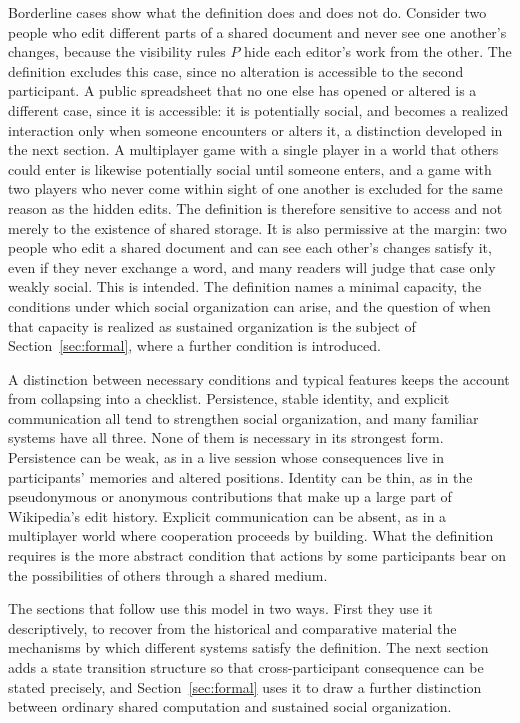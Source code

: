 \documentclass[11pt]{article}
\theoremstyle{remark}
\newcommand{\Pp}{P}
\begin{document}
Borderline cases show what the definition does and does not do. Consider two people who edit different parts of a shared document and never see one another's changes, because the visibility rules $\Pp$ hide each editor's work from the other. The definition excludes this case, since no alteration is accessible to the second participant. A public spreadsheet that no one else has opened or altered is a different case, since it is accessible: it is potentially social, and becomes a realized interaction only when someone encounters or alters it, a distinction developed in the next section. A multiplayer game with a single player in a world that others could enter is likewise potentially social until someone enters, and a game with two players who never come within sight of one another is excluded for the same reason as the hidden edits. The definition is therefore sensitive to access and not merely to the existence of shared storage. It is also permissive at the margin: two people who edit a shared document and can see each other's changes satisfy it, even if they never exchange a word, and many readers will judge that case only weakly social. This is intended. The definition names a minimal capacity, the conditions under which social organization can arise, and the question of when that capacity is realized as sustained organization is the subject of Section~\ref{sec:formal}, where a further condition is introduced.

A distinction between necessary conditions and typical features keeps the account from collapsing into a checklist. Persistence, stable identity, and explicit communication all tend to strengthen social organization, and many familiar systems have all three. None of them is necessary in its strongest form. Persistence can be weak, as in a live session whose consequences live in participants' memories and altered positions. Identity can be thin, as in the pseudonymous or anonymous contributions that make up a large part of Wikipedia's edit history. Explicit communication can be absent, as in a multiplayer world where cooperation proceeds by building. What the definition requires is the more abstract condition that actions by some participants bear on the possibilities of others through a shared medium.

The sections that follow use this model in two ways. First they use it descriptively, to recover from the historical and comparative material the mechanisms by which different systems satisfy the definition. The next section adds a state transition structure so that cross-participant consequence can be stated precisely, and Section~\ref{sec:formal} uses it to draw a further distinction between ordinary shared computation and sustained social organization.
\end{document}
